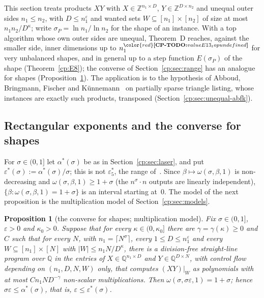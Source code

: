 \documentclass[11pt]{article}
\makeatletter
\newtheorem{proposition}[theorem]{Proposition}
\theoremstyle{definition}
\theoremstyle{remark}
\DeclareRobustCommand{\CPTODO}[1]{{\color{red}\textbf{[CP-TODO:} #1\textbf{]}}}
\providecommand{\eps}{\varepsilon}
\providecommand{\Z}{\mathbb{Z}}
\providecommand{\Q}{\mathbb{Q}}
\newcommand{\abs}[1]{\lvert #1\rvert}
\newcommand{\es}{\varepsilon^*_5}             %
\newcommand{\ThmD}{Theorem~D}                               %
\newcommand{\alstar}{\alpha^*}                %
\newcommand{\cpv}[1]{\ifcsname cpv@#1\endcsname\csname cpv@#1\endcsname\else\CPTODO{value #1 undefined}\fi}
\makeatother
\begin{document}
This section treats products $XY$ with $X\in\Z^{n_1\times D}$, $Y\in\Z^{D\times n_2}$ and unequal outer sides $n_1\le n_2$, with $D\le n_1^\eps$ and wanted sets $W\subseteq[n_1]\times[n_2]$ of size at most $n_1n_2/D^\kappa$; write $\sigma_P=\ln n_1/\ln n_2$ for the shape of an instance. With a top algorithm whose own outer sides are unequal, \ThmD{} reaches, against the smaller side, inner dimensions up to $n_1^{\cpv{E13_top}}$ for very unbalanced shapes, and in general up to a step function $E(\sigma_P)$ of the shape (Theorem~\ref{cp:E8}); the converse of Section~\ref{cp:sec:range} has an analogue for shapes (Proposition~\ref{cp:E1}). The application is to the hypothesis of Abboud, Bringmann, Fischer and Künnemann~\cite{ABFK24} on partially sparse triangle listing, whose instances are exactly such products, transposed (Section~\ref{cp:sec:unequal-abfk}).

\subsection{Rectangular exponents and the converse for shapes}\label{cp:sec:unequal-conv}

For $\sigma\in(0,1]$ let $\alstar(\sigma)$ be as in Section~\ref{cp:sec:laser}, and put $\eps^*(\sigma):=\alstar(\sigma)/\sigma$; this is not $\es$, the range of~\cite{v2}. Since $\beta\mapsto\omega(\sigma,\beta,1)$ is non-decreasing and $\omega(\sigma,\beta,1)\ge1+\sigma$ (the $n^\sigma\cdot n$ outputs are linearly independent), $\{\beta:\omega(\sigma,\beta,1)=1+\sigma\}$ is an interval starting at~$0$. The model of the next proposition is the multiplication model of Section~\ref{cp:sec:models}.

\begin{proposition}[the converse for shapes; multiplication model]\label{cp:E1}
Fix $\sigma\in(0,1]$, $\eps>0$ and $\kappa_0>0$. Suppose that for every $\kappa\in(0,\kappa_0]$ there are $\gamma=\gamma(\kappa)\ge0$ and $C$ such that for every $N$, with $n_1=\lceil N^\sigma\rceil$, every $1\le D\le n_1^\eps$ and every $W\subseteq[n_1]\times[N]$ with $\abs W\le n_1N/D^\kappa$, there is a division-free straight-line program over $\Q$ in the entries of $X\in\Q^{n_1\times D}$ and $Y\in\Q^{D\times N}$, with control flow depending on $(n_1,D,N,W)$ only, that computes $(XY)|_W$ as polynomials with at most $Cn_1ND^{-\gamma}$ non-scalar multiplications. Then $\omega(\sigma,\sigma\eps,1)=1+\sigma$; hence $\sigma\eps\le\alstar(\sigma)$, that is, $\eps\le\eps^*(\sigma)$.
\end{proposition}
\end{document}
